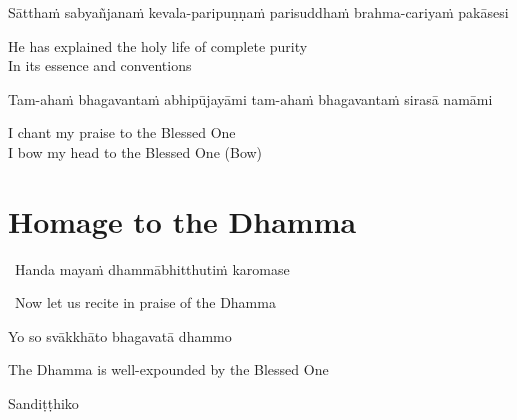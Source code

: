 \begin{pali-hang}
  Sātthaṁ sabyañjanaṁ kevala-paripuṇṇaṁ parisuddhaṁ brahma-cariyaṁ pakāsesi
\end{pali-hang}

\begin{english}
  He has explained the holy life of complete purity\hyperlink{endnote4-appendix}{\hypertarget{endnote4-body}{}}\\
  In its essence and conventions
\end{english}

\begin{pali-hang}
  Tam-ahaṁ bhagavantaṁ abhipūjayāmi tam-ahaṁ bhagavantaṁ sirasā namāmi
\end{pali-hang}

\begin{english}
  I chant my praise to the Blessed One\\
  I bow my head to the Blessed One \hfill{(Bow)}
\end{english}

\section{Homage to the Dhamma}
\label{homage-dhamma}

\begin{leader}
  \anglebracketleft\ \hspace{-0.5mm}Handa mayaṁ dhammābhitthutiṁ karomase \hspace{-0.5mm}\anglebracketright\
\end{leader}
\begin{leader-english-belowpali}
  \anglebracketleft\ \hspace{-0.5mm}Now let us recite in praise of the Dhamma \hspace{-0.5mm}\anglebracketright\
\end{leader-english-belowpali}

Yo so svākkhāto bhagavatā dhammo

\begin{english}
  The Dhamma is well-expounded by the Blessed One
\end{english}

Sandiṭṭhiko

